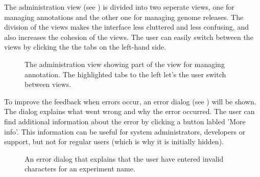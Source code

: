 The administration view (see ) is divided into two seperate views, one for managing annotations and the other one for managing genome releases. The division of the views makes the interface less cluttered and less confusing, and also increases the cohesion of the views. The user can easily switch between the views by clicking the the tabs on the left-hand side.

\begin{figure}[h]
	\caption{\footnotesize The administration view showing part of the view for managing annotation. The highlighted tabs to the left let's the user switch between views.}
	\label{fig:des_admin_view}
\end{figure}

To improve the feedback when errors occur, an error dialog (see ) will be shown. The dialog explains what went wrong and why the error occurred. The user can find additional information about the error by clicking a button labled 'More info'. This information can be useful for system administrators, developers or support, but not for regular users (which is why it is initially hidden).

\begin{figure}[h!]
	\caption{\footnotesize An error dialog that explains that the user have entered invalid characters for an experiment name.}
	\label{fig:des_error_dialog}
\end{figure}

\FloatBarrier

